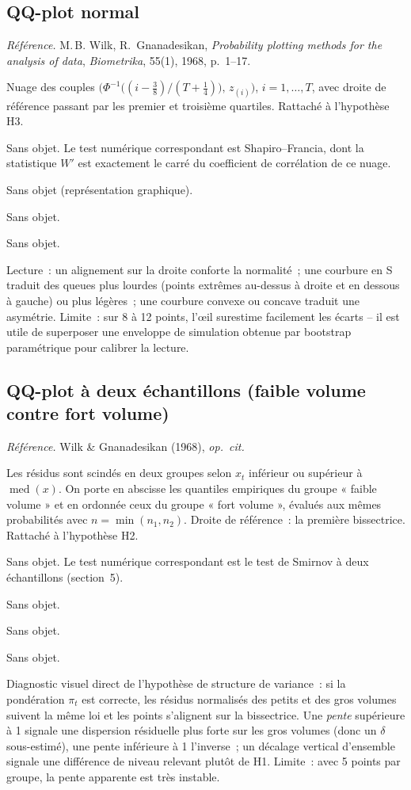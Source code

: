 \documentclass[a4paper,11pt]{article}
\newcommand{\refl}[1]{{\small\textcolor{maincolor!70!black}{\textit{Référence.} #1}}\par\smallskip}
\newcounter{ficheid}
\newenvironment{fiche}[1]{%
  \stepcounter{ficheid}%
  \phantomsection
  \subsection{#1}%
  \label{fiche:\theficheid}%
}{%
  \end{description}\vspace{0.5em}%
}
\newcommand{\Cadre}{%
  \begin{description}[leftmargin=0pt, style=unboxed, itemsep=3pt, topsep=3pt, parsep=2pt]%
  \item[\textcolor{financeblue}{\textbf{1. Cadre, notations et hypothèses de validité (non testées).}}]}
\newcommand{\Hzero}{\item[\textcolor{financeblue}{\textbf{2. Hypothèse nulle.}}]}
\newcommand{\Stat}{\item[\textcolor{financeblue}{\textbf{3. Statistique de test.}}]}
\newcommand{\Loi}{\item[\textcolor{financeblue}{\textbf{4. Loi sous $H_0$.}}]}
\newcommand{\Pval}{\item[\textcolor{financeblue}{\textbf{5. p-value.}}]}
\newcommand{\Usage}{\item[\textcolor{financeblue}{\textbf{6. Usage et limites.}}]}
\begin{document}
\begin{fiche}{QQ-plot normal}
\refl{M.\,B. Wilk, R.~Gnanadesikan, \emph{Probability plotting methods for the analysis of data},
\emph{Biometrika}, 55(1), 1968, p.~1--17.}
\Cadre
Nuage des couples $\big(\Phi^{-1}\!\big((i-\tfrac38)/(T+\tfrac14)\big),\, z_{(i)}\big)$,
$i=1,\dots,T$, avec droite de référence passant par les premier et troisième quartiles. Rattaché
à l'hypothèse H3.
\Hzero
Sans objet. Le test numérique correspondant est Shapiro--Francia, dont la statistique $W'$ est
exactement le carré du coefficient de corrélation de ce nuage.
\Stat
Sans objet (représentation graphique).
\Loi
Sans objet.
\Pval
Sans objet.
\Usage
Lecture~: un alignement sur la droite conforte la normalité~; une courbure en S traduit des queues
plus lourdes (points extrêmes au-dessus à droite et en dessous à gauche) ou plus légères~; une
courbure convexe ou concave traduit une asymétrie. Limite~: sur 8 à 12 points, l'œil surestime
facilement les écarts -- il est utile de superposer une enveloppe de simulation obtenue par
bootstrap paramétrique pour calibrer la lecture.
\end{fiche}

\begin{fiche}{QQ-plot à deux échantillons (faible volume contre fort volume)}
\refl{Wilk \& Gnanadesikan (1968), \emph{op.\ cit.}}
\Cadre
Les résidus sont scindés en deux groupes selon $x_t$ inférieur ou supérieur à
$\operatorname{med}(x)$. On porte en abscisse les quantiles empiriques du groupe « faible volume »
et en ordonnée ceux du groupe « fort volume », évalués aux mêmes probabilités avec
$n = \min(n_1,n_2)$. Droite de référence~: la première bissectrice. Rattaché à l'hypothèse H2.
\Hzero
Sans objet. Le test numérique correspondant est le test de Smirnov à deux échantillons
(section~5).
\Stat
Sans objet.
\Loi
Sans objet.
\Pval
Sans objet.
\Usage
Diagnostic visuel direct de l'hypothèse de structure de variance~: si la pondération $\pi_t$ est
correcte, les résidus normalisés des petits et des gros volumes suivent la même loi et les points
s'alignent sur la bissectrice. Une \emph{pente} supérieure à 1 signale une dispersion résiduelle
plus forte sur les gros volumes (donc un $\delta$ sous-estimé), une pente inférieure à 1
l'inverse~; un décalage vertical d'ensemble signale une différence de niveau relevant plutôt de
H1. Limite~: avec 5 points par groupe, la pente apparente est très instable.
\end{fiche}
\end{document}
